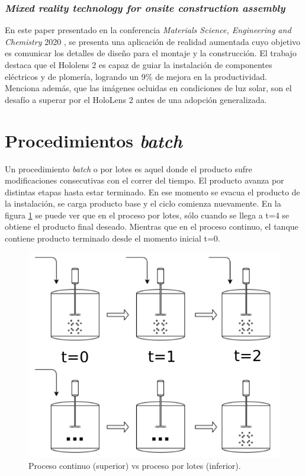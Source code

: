 \subsubsection{\textit{Mixed reality technology for onsite construction assembly}}
En este paper presentado en la conferencia \textit{Materials Science, Engineering and Chemistry} 2020 \citep{MX3}, se presenta una aplicación de realidad aumentada cuyo objetivo es comunicar los detalles de diseño para el montaje y la construcción. El trabajo destaca que el Hololens 2 es capaz de guiar la instalación de componentes eléctricos y de plomería, logrando un 9\% de mejora en la productividad. Menciona además, que las imágenes ocluidas en condiciones de luz solar, son el desafío a superar por el HoloLens 2 antes de una adopción generalizada.

\section{Procedimientos \textit{batch}}

Un procedimiento \textit{batch} o por lotes es aquel donde el producto sufre modificaciones consecutivas con el correr del tiempo\citep{Batch:1}. El producto avanza por distintas etapas hasta estar terminado. En ese momento se evacua el producto de la instalación, se carga producto base y el ciclo comienza nuevamente. En la figura \ref{fig:tanks} se puede ver que en el proceso por lotes, sólo cuando se llega a t=4 se obtiene el producto final deseado. Mientras que en el proceso continuo, el tanque contiene producto terminado desde el momento inicial t=0.

\begin{figure}[htpb]
	\centering
	\includegraphics[scale=.45]{./Figures/tanks.png}
	\caption{Proceso continuo (superior) vs proceso por lotes (inferior).}
	\label{fig:tanks}
\end{figure}

